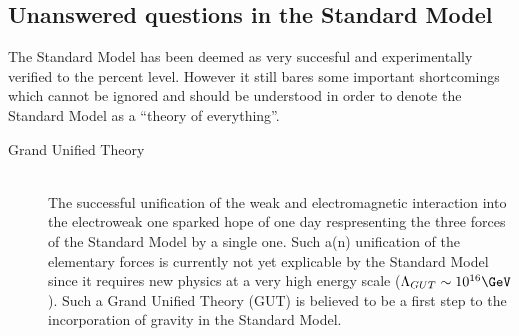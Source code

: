\subsection{Unanswered questions in the Standard Model} \label{sec::QuestionsSM}
The Standard Model has been deemed as very succesful and experimentally verified to the percent level. However it still bares some important shortcomings which cannot be ignored and should be understood in order to denote the Standard Model as a ``theory of everything''. 

\begin{myindentpar}
  \begin{description}
    \item[Grand Unified Theory] \hfill \\
    The successful unification of the weak and electromagnetic interaction into the electroweak one sparked hope of one day respresenting the three forces of the Standard Model by a single one.
    Such a(n) unification of the elementary forces is currently not yet explicable by the Standard Model since it requires new physics at a very high energy scale ($\Lambda_{GUT} \sim 10^{16} \GeV$).
    Such a Grand Unified Theory (GUT) is believed to be a first step to the incorporation of gravity in the Standard Model.
    

\end{description}
\end{myindentpar}

